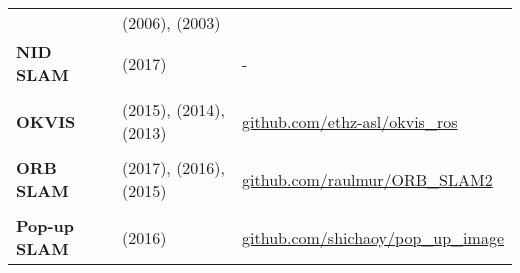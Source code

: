 \documentclass[a4paper,12pt]{scrartcl}
\begin{document}
{\begin{longtable}{l|l|l}
                                                                                                                                  & \cite{Howard2006} (2006), \cite{Liu2003} (2003)                                            &   \\
    \textbf{NID SLAM}                                                                                                             & \cite{Pascoe2017} (2017)                                                                   & - \\
                                                                                                                                  &                                                                                            &   \\ [-3mm]
    \textbf{OKVIS}                                                                                                                & \cite{Leutenegger2015} (2015), \cite{Leutenegger2014} (2014), \cite{Leutenegger2013} (2013)
                                                                                                                                  & {\href{https://github.com/ethz-asl/okvis_ros}{github.com/ethz-asl/okvis\_ros}}            \\
                                                                                                                                  &                                                                                            &   \\ [-3mm]
    \textbf{ORB SLAM}
                                                                                                                                  & \cite{Mur-Artal2017} (2017), \cite{Mur-Artal2016a} (2016), \cite{Mur-Artal2015} (2015)     &
    \href{https://github.com/raulmur/ORB_SLAM2}{github.com/raulmur/ORB\_SLAM2}                                                   \\
                                                                                                                                  &                                                                                            &   \\ [-3mm]
    \textbf{Pop-up SLAM}                                                                                                          & \cite{Yang2016} (2016)
                                                                                                                                  & {\href{https://github.com/shichaoy/pop_up_image}{github.com/shichaoy/pop\_up\_image}}     \\

\end{longtable}}
\end{document}
